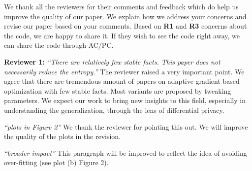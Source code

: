 \documentclass{article}
\begin{document}
We thank all the reviewers for their comments and feedback which do help us improve the quality of our paper. We explain how we address your concerns and revise our paper based on your comments.
Based on \textbf{R1} and \textbf{R3} concerns about the code, we are happy to share it. If they wish to see the code right away, we can share the code through AC/PC. \vspace{-5pt}

\textbf{Reviewer 1:}\textit{ ``There are relatively few stable facts. This paper does not necessarily reduce the entropy.''}
The reviewer raised a very important point. We agree that there are tremendous amount of papers on adaptive gradient based optimization with few stable facts. 
Most variants are proposed by tweaking parameters. 
We expect our work to bring new insights to this field, especially in understanding the generalization, through the lens of differential privacy.\vspace{-5pt}

\textit{ ``plots in Figure 2''}
We thank the reviewer for pointing this out. We will improve the quality of the plots in the revision.\vspace{-5pt}

\textit{ ``broader impact''} This paragraph will be improved to reflect the idea of avoiding over-fitting (see plot (b) Figure 2).\vspace{-5pt}

\end{document}
